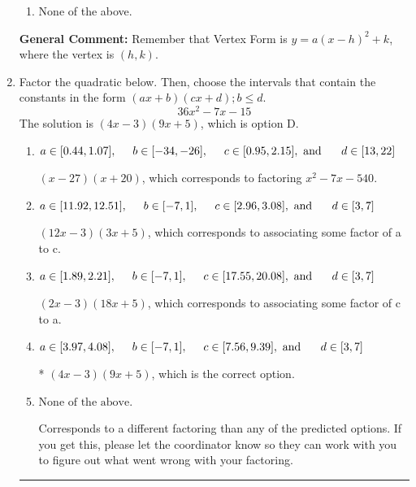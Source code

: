 \documentclass{extbook}[14pt]
\newcommand{\litem}[1]{\item #1

\rule{\textwidth}{0.4pt}}
\begin{document}
\begin{enumerate}
{\begin{enumerate}[label=\Alph*.]
\begin{multicols}{2}
\end{multicols}\item None of the above.\end{enumerate}
\textbf{General Comment:} Remember that Vertex Form is $y = a(x-h)^2+k$, where the vertex is $(h, k)$.
}
\litem{
Factor the quadratic below. Then, choose the intervals that contain the constants in the form $(ax+b)(cx+d); b \leq d.$
\[ 36x^{2} -7 x -15 \]
The solution is \( (4x -3)(9x + 5) \), which is option D.\begin{enumerate}[label=\Alph*.]
\item \( a \in [0.44, 1.07], \hspace*{5mm} b \in [-34, -26], \hspace*{5mm} c \in [0.95, 2.15], \text{ and } \hspace*{5mm} d \in [13, 22] \)

 $(x -27)(x + 20)$, which corresponds to factoring $x^{2} -7 x -540$.
\item \( a \in [11.92, 12.51], \hspace*{5mm} b \in [-7, 1], \hspace*{5mm} c \in [2.96, 3.08], \text{ and } \hspace*{5mm} d \in [3, 7] \)

 $(12x -3)(3x + 5)$, which corresponds to associating some factor of a to c.
\item \( a \in [1.89, 2.21], \hspace*{5mm} b \in [-7, 1], \hspace*{5mm} c \in [17.55, 20.08], \text{ and } \hspace*{5mm} d \in [3, 7] \)

 $(2x -3)(18x + 5)$, which corresponds to associating some factor of c to a.
\item \( a \in [3.97, 4.08], \hspace*{5mm} b \in [-7, 1], \hspace*{5mm} c \in [7.56, 9.39], \text{ and } \hspace*{5mm} d \in [3, 7] \)

* $(4x -3)(9x + 5)$, which is the correct option.
\item \( \text{None of the above.} \)

 Corresponds to a different factoring than any of the predicted options. If you get this, please let the coordinator know so they can work with you to figure out what went wrong with your factoring.
\end{enumerate}

}
\end{enumerate}
\end{document}
